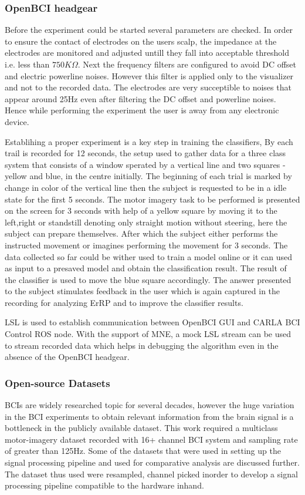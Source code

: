 \subsubsection{OpenBCI headgear}
Before the experiment could be started several parameters are checked. In order to ensure the contact of electrodes on the users scalp, the impedance at the electrodes are monitored and adjusted untill they fall into acceptable threshold i.e. less than $750K\Omega$. Next the frequency filters are configured to avoid DC offset and electric powerline noises. However this filter is applied only to the visualizer and not to the recorded data. The electrodes are very succeptible to noises that appear around 25Hz even after
filtering the DC offset and powerline noises. Hence while performing the experiment the user is away from any electronic device.

Establihing a proper experiment is a key step in training the classifiers, By \cite{} each trail is recorded for 12 seconds, the setup used to gather data for a three class system that consists of a window sperated by a vertical line and two squares - yellow and blue,  in the centre initially. The beginning of each trial is marked by change in color of the vertical line then the subject is requested to be in a idle state for the first 5 seconds. The motor imagery task to be performed is presented on the screen  for 3 seconds with help of a yellow square by moving it to the left,right or standstill denoting only straight motion without steering, here the subject can prepare themselves. After which the subject either performs the instructed movement or imagines performing the movement for 3 seconds. The data collected so far could be wither used to train a model online or it can used as input to a presaved model and obtain the classification result. The result of the classifier is used to move the blue square accordingly. The answer presented to the subject stimulates feedback in the user which is again captured in the recording for analyzing ErRP and to improve the classifier results.

LSL is used to establish communication between OpenBCI GUI and CARLA BCI Control ROS node. With the support of MNE, a mock LSL stream can be used to stream recorded data which helps in debugging the algorithm even in the absence of the OpenBCI headgear.

\subsubsection{Open-source Datasets}
    BCIs are widely researched topic for several decades, however the huge variation in the BCI experiments to obtain relevant information from the brain signal is a bottleneck in the publicly available dataset. This work required a multiclass motor-imagery dataset recorded with 16+ channel BCI system and sampling rate of greater than 125Hz. Some of the datasets that were used in setting up the signal processing pipeline and used for comparative analysis are discussed further. The dataset thus used were resampled, channel picked inorder to develop a signal processing pipeline compatible to the hardware inhand.

